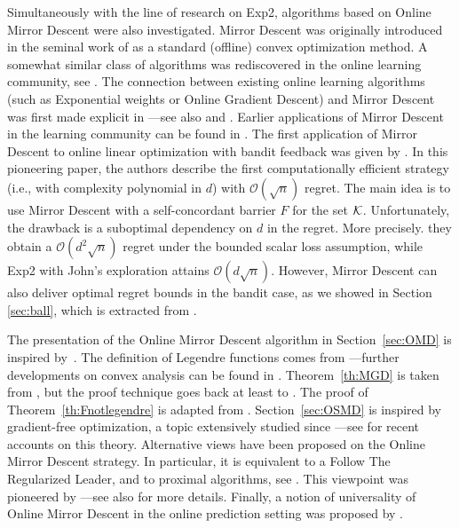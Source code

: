 Simultaneously with the line of research on Exp2, algorithms based on Online Mirror Descent were also investigated. Mirror Descent was originally introduced in the seminal work of \cite{Nem79, NY83} as a standard (offline) convex optimization method. A somewhat similar class of algorithms was rediscovered in the online learning community, see \cite{HW98, GLS01, KW01, Sha07}. The connection between existing online learning algorithms (such as Exponential weights or Online Gradient Descent) and Mirror Descent was first made explicit in \cite{CL06} ---see also \cite{Rak09} and \cite{Haz11}. Earlier applications of Mirror Descent in the learning community can be found in \cite{JNTV05}. The first application of Mirror Descent to online linear optimization with bandit feedback was given by \cite{AHR08}. In this pioneering paper, the authors describe the first computationally efficient strategy (i.e., with complexity polynomial in $d$) with $\mathcal{O}(\sqrt{n})$ regret. The main idea is to use Mirror Descent with a self-concordant barrier $F$ for the set $\mathcal{K}$. Unfortunately, the drawback is a suboptimal dependency on $d$ in the regret. More precisely. they obtain a $\mathcal{O}(d^2 \sqrt{n})$ regret under the bounded scalar loss assumption, while Exp2 with John's exploration attains $\mathcal{O}(d \sqrt{n})$. However, Mirror Descent can also deliver optimal regret bounds in the bandit case, as we showed in Section \ref{sec:ball}, which is extracted from \cite{BCK12}.

The presentation of the Online Mirror Descent algorithm in Section~\ref{sec:OMD} is inspired by~\cite{Bub11}. The definition of Legendre functions comes from \cite[Chapter 11]{CL06} ---further developments on convex analysis can be found in \cite{HL01, BV04}. Theorem~\ref{th:MGD} is taken from \cite{ABL11}, but the proof technique goes back at least to \cite{BN99}. The proof of Theorem~\ref{th:Fnotlegendre} is adapted from \cite{KST10}. Section~\ref{sec:OSMD} is inspired by gradient-free optimization, a topic extensively studied since \cite{RM51, KW52} ---see \cite{NJLS09, CSV09, Nes11, BM11} for recent accounts on this theory.
Alternative views have been proposed on the Online Mirror Descent strategy. In particular, it is equivalent to a Follow The Regularized Leader, and to proximal algorithms, see \cite{Rak09}. This viewpoint was pioneered by \cite{BT03} ---see also \cite{BPSS11} for more details. Finally, a notion of universality of Online Mirror Descent in the online prediction setting was proposed by \cite{SST11}.

